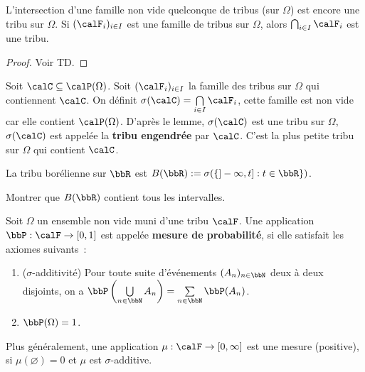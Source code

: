 \begin{lem}
    L'intersection d'une famille non vide quelconque de tribus (sur $\Omega$) est encore une tribu sur $\Omega$.
    Si $(\calF_i)_{i \in I}$ est une famille de tribus sur $\Omega$, alors
    $\bigcap_{i \in I} \calF_i$ est une tribu.
\end{lem}

\begin{proof}
    Voir TD.
\end{proof}

\begin{deff}
    Soit $\calC \subseteq \calP(\Omega)$.
    Soit $(\calF_i)_{i \in I}$ la famille des tribus sur $\Omega$ qui contiennent $\calC$.
    On définit $\sigma(\calC) = \bigcap\limits_{i \in I} \calF_i$,
    cette famille est non vide car elle contient $\calP(\Omega)$.
    D'après le lemme, $\sigma(\calC)$ est une tribu sur $\Omega$,
    $\sigma(\calC)$ est appelée la \textbf{tribu engendrée} par $\calC$.
    C'est la plus petite tribu sur $\Omega$ qui contient $\calC$.
\end{deff}

\begin{exem}
    La tribu borélienne sur $\bbR$ est $B(\bbR) := \sigma(\{ ]-\infty, t] : t \in \bbR \})$.
\end{exem}

\begin{exer}
    Montrer que $B(\bbR)$ contient tous les intervalles.
\end{exer}

\begin{deff}
    Soit $\Omega$ un ensemble non vide muni d'une tribu $\calF$.
    Une application $\bbP: \calF \to [0, 1]$ est appelée \textbf{mesure de probabilité},
    si elle satisfait les axiomes suivants~:
    \begin{enumerate}
        \item ($\sigma$-additivité) Pour toute suite d'événements $(A_n)_{n \in \bbN}$ deux à deux disjoints,
              on a $\bbP \left(\bigcup\limits_{n \in \bbN} A_n\right) = \sum\limits_{n \in \bbN} \bbP(A_n)$.
        \item $\bbP(\Omega) = 1$.
    \end{enumerate}
\end{deff}

\begin{rqq}
    Plus généralement, une application $\mu: \calF \to [0, \infty]$ est une mesure (positive),
    si $\mu(\varnothing) = 0$ et $\mu$ est $\sigma$-additive.
\end{rqq}

